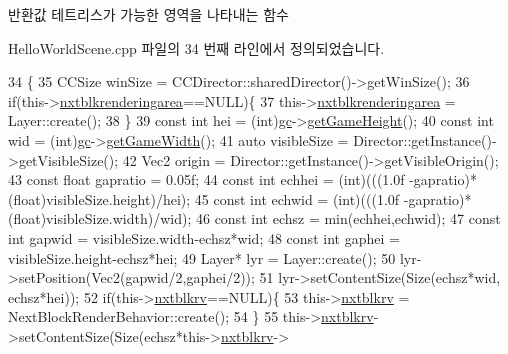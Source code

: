 \begin{DoxyReturn}{반환값}
테트리스가 가능한 영역을 나타내는 함수 
\end{DoxyReturn}


Hello\+World\+Scene.\+cpp 파일의 34 번째 라인에서 정의되었습니다.


\begin{DoxyCode}
34                           \{
35     CCSize winSize = CCDirector::sharedDirector()->getWinSize();
36     \textcolor{keywordflow}{if}(this->\hyperlink{class_hello_world_a6ebd3cb915150357bd357df1ff4da932}{nxtblkrenderingarea}==NULL)\{
37         this->\hyperlink{class_hello_world_a6ebd3cb915150357bd357df1ff4da932}{nxtblkrenderingarea} = Layer::create();
38     \}
39     \textcolor{keyword}{const} \textcolor{keywordtype}{int} hei = (int)\hyperlink{class_hello_world_a547cb213126911d9a7151f8259dc7102}{gc}->\hyperlink{class_tetris_1_1_game_controller_a10163479e02572450b886ff0654078b4}{getGameHeight}();
40     \textcolor{keyword}{const} \textcolor{keywordtype}{int} wid = (int)\hyperlink{class_hello_world_a547cb213126911d9a7151f8259dc7102}{gc}->\hyperlink{class_tetris_1_1_game_controller_a256cff75224efe165e1c5409c69b0503}{getGameWidth}();
41     \textcolor{keyword}{auto} visibleSize = Director::getInstance()->getVisibleSize();
42     Vec2 origin = Director::getInstance()->getVisibleOrigin();
43     \textcolor{keyword}{const} \textcolor{keywordtype}{float} gapratio = 0.05f;
44     \textcolor{keyword}{const} \textcolor{keywordtype}{int} echhei = (int)(((1.0f -gapratio)*(\textcolor{keywordtype}{float})visibleSize.height)/hei);
45     \textcolor{keyword}{const} \textcolor{keywordtype}{int} echwid =  (int)(((1.0f -gapratio)*(float)visibleSize.width)/wid);
46     \textcolor{keyword}{const} \textcolor{keywordtype}{int} echsz = min(echhei,echwid);
47     \textcolor{keyword}{const} \textcolor{keywordtype}{int} gapwid = visibleSize.width-echsz*wid;
48     \textcolor{keyword}{const} \textcolor{keywordtype}{int} gaphei = visibleSize.height-echsz*hei;
49     Layer* lyr = Layer::create();
50     lyr->setPosition(Vec2(gapwid/2,gaphei/2));
51     lyr->setContentSize(Size(echsz*wid, echsz*hei));
52     \textcolor{keywordflow}{if}(this->\hyperlink{class_hello_world_ac06ca16fc5a18d32c58e0229c24817f6}{nxtblkrv}==NULL)\{
53         this->\hyperlink{class_hello_world_ac06ca16fc5a18d32c58e0229c24817f6}{nxtblkrv} = NextBlockRenderBehavior::create();
54     \}
55     this->\hyperlink{class_hello_world_ac06ca16fc5a18d32c58e0229c24817f6}{nxtblkrv}->setContentSize(Size(echsz*this->\hyperlink{class_hello_world_ac06ca16fc5a18d32c58e0229c24817f6}{nxtblkrv}->

\end{DoxyCode}
